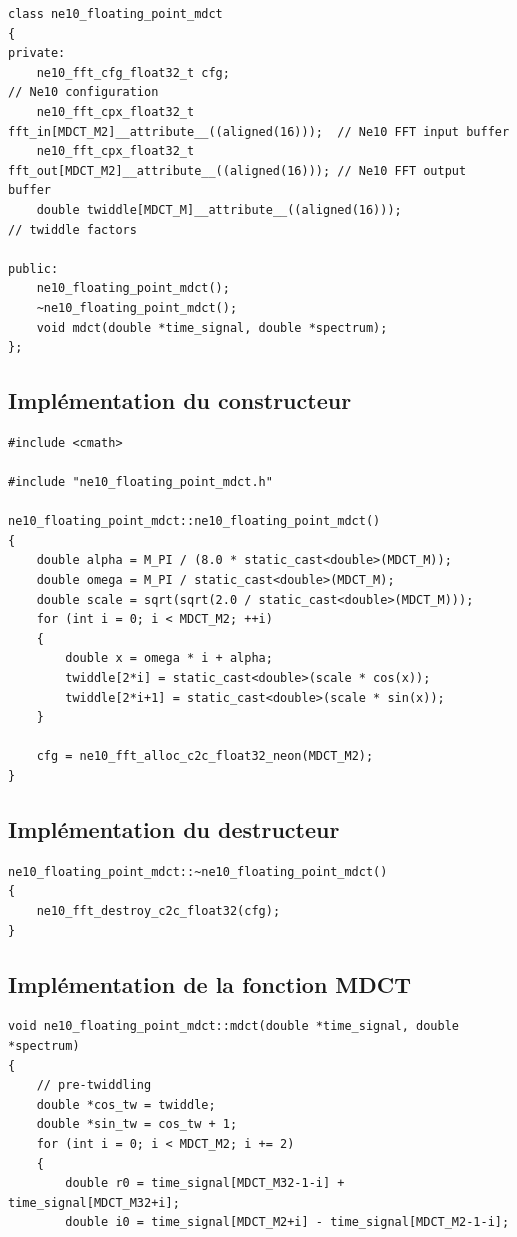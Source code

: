 \documentclass{article}
\begin{document}
\begin{appendix}
\begin{lstlisting}
class ne10_floating_point_mdct
{
private:
    ne10_fft_cfg_float32_t cfg;                                          // Ne10 configuration
    ne10_fft_cpx_float32_t fft_in[MDCT_M2]__attribute__((aligned(16)));  // Ne10 FFT input buffer
    ne10_fft_cpx_float32_t fft_out[MDCT_M2]__attribute__((aligned(16))); // Ne10 FFT output buffer
    double twiddle[MDCT_M]__attribute__((aligned(16)));                  // twiddle factors

public:
    ne10_floating_point_mdct();
    ~ne10_floating_point_mdct();
    void mdct(double *time_signal, double *spectrum);
};
        \end{lstlisting}

        \subsection{Implémentation du constructeur}
        \label{an:mdct_ne10_f32_constructor}
        \begin{lstlisting}
#include <cmath>

#include "ne10_floating_point_mdct.h"

ne10_floating_point_mdct::ne10_floating_point_mdct()
{
    double alpha = M_PI / (8.0 * static_cast<double>(MDCT_M));
    double omega = M_PI / static_cast<double>(MDCT_M);
    double scale = sqrt(sqrt(2.0 / static_cast<double>(MDCT_M)));
    for (int i = 0; i < MDCT_M2; ++i) 
    {
        double x = omega * i + alpha;
        twiddle[2*i] = static_cast<double>(scale * cos(x));
        twiddle[2*i+1] = static_cast<double>(scale * sin(x));
    }

    cfg = ne10_fft_alloc_c2c_float32_neon(MDCT_M2);
}
        \end{lstlisting}

        \subsection{Implémentation du destructeur}
        \label{an:mdct_ne10_f32_destructor}
        \begin{lstlisting}
ne10_floating_point_mdct::~ne10_floating_point_mdct()
{
    ne10_fft_destroy_c2c_float32(cfg);
}
        \end{lstlisting}

        \subsection{Implémentation de la fonction MDCT}
        \label{an:mdct_ne10_f32_func}
        \begin{lstlisting}
void ne10_floating_point_mdct::mdct(double *time_signal, double *spectrum)
{
    // pre-twiddling
    double *cos_tw = twiddle;
    double *sin_tw = cos_tw + 1;
    for (int i = 0; i < MDCT_M2; i += 2)
    {
        double r0 = time_signal[MDCT_M32-1-i] + time_signal[MDCT_M32+i];
        double i0 = time_signal[MDCT_M2+i] - time_signal[MDCT_M2-1-i];


\end{lstlisting}
\end{appendix}
\end{document}
